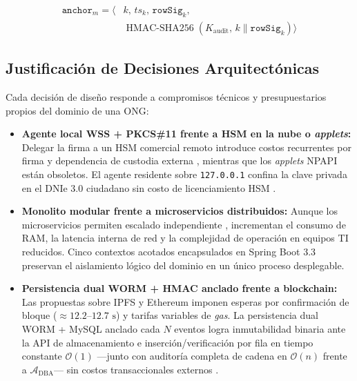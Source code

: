 \documentclass[runningheads,twocolumn]{llncs}
\begin{document}
\begin{enumerate}
    \begin{equation}
    \begin{aligned}
        \texttt{anchor}_m = \big\langle &k,\, ts_k,\, \texttt{rowSig}_k,\\
        &\operatorname{HMAC\text{-}SHA256}(K_{\text{audit}},\, k \parallel \texttt{rowSig}_k)\big\rangle
    \end{aligned}
    \label{eq:external_anchor}
    \end{equation}
\end{enumerate}

\subsection{Justificación de Decisiones Arquitectónicas}
Cada decisión de diseño responde a compromisos técnicos y presupuestarios propios del dominio de una ONG:
\begin{itemize}
    \item \textbf{Agente local WSS + PKCS\#11 frente a HSM en la nube o \textit{applets}:} Delegar la firma a un HSM comercial remoto introduce costos recurrentes por firma y dependencia de custodia externa \cite{swapna2026,doynov2026}, mientras que los \textit{applets} NPAPI están obsoletos. El agente residente sobre \texttt{127.0.0.1} confina la clave privada en el DNIe 3.0 ciudadano sin costo de licenciamiento HSM \cite{liu2026,reniec2025}.
    \item \textbf{Monolito modular frente a microservicios distribuidos:} Aunque los microservicios permiten escalado independiente \cite{doynov2026}, incrementan el consumo de RAM, la latencia interna de red y la complejidad de operación en equipos TI reducidos. Cinco contextos acotados encapsulados en Spring Boot 3.3 preservan el aislamiento lógico del dominio en un único proceso desplegable.
    \item \textbf{Persistencia dual WORM + HMAC anclado frente a blockchain:} Las propuestas sobre IPFS y Ethereum \cite{han2025,satybaldy2022} imponen esperas por confirmación de bloque ($\approx 12.2$--$12.7\text{ s}$) y tarifas variables de \textit{gas}. La persistencia dual WORM + MySQL anclado cada $N$ eventos logra inmutabilidad binaria ante la API de almacenamiento e inserción/verificación por fila en tiempo constante $\mathcal{O}(1)$ ---junto con auditoría completa de cadena en $\mathcal{O}(n)$ frente a $\mathcal{A}_{\text{DBA}}$--- sin costos transaccionales externos \cite{soni2026,doynov2026}.
\end{itemize}
\end{document}
